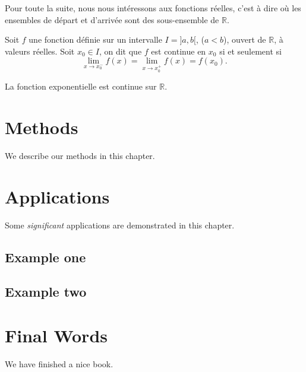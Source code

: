 \documentclass[]{book}
\theoremstyle{definition}
\theoremstyle{definition}
\theoremstyle{definition}
\theoremstyle{remark}
\let\BeginKnitrBlock\begin \let\EndKnitrBlock\end
\begin{document}
\begin{quote}
\end{quote}

Pour toute la suite, nous nous intéressons aux fonctions réelles, c'est à dire où les ensembles de départ et d'arrivée sont des sous-ensemble de \(\mathbb R\).

\begin{quote}
\end{quote}

\BeginKnitrBlock{definition}[Continuité]
\protect\hypertarget{def:unnamed-chunk-6}{}{\label{def:unnamed-chunk-6} \iffalse (Continuité) \fi{} }Soit \(f\) une fonction définie sur un intervalle \(I=]a,b[\), (\(a<b\)), ouvert de \(\mathbb R\), à valeurs réelles. Soit \(x_0\in I\), on dit que \(f\) est continue en \(x_0\) si et seulement si
\[
\lim_{x\rightarrow x_0^-}f(x)=\lim_{x\rightarrow x_0^+}f(x)=f(x_0).
\]
\EndKnitrBlock{definition}

\BeginKnitrBlock{example}
\protect\hypertarget{exm:unnamed-chunk-7}{}{\label{exm:unnamed-chunk-7} }La fonction exponentielle est continue sur \(\mathbb R\).
\EndKnitrBlock{example}

\hypertarget{methods}{%
\chapter{Methods}\label{methods}}

We describe our methods in this chapter.

\hypertarget{applications}{%
\chapter{Applications}\label{applications}}

Some \emph{significant} applications are demonstrated in this chapter.

\hypertarget{example-one}{%
\section{Example one}\label{example-one}}

\hypertarget{example-two}{%
\section{Example two}\label{example-two}}

\hypertarget{final-words}{%
\chapter{Final Words}\label{final-words}}

We have finished a nice book.


\end{document}
